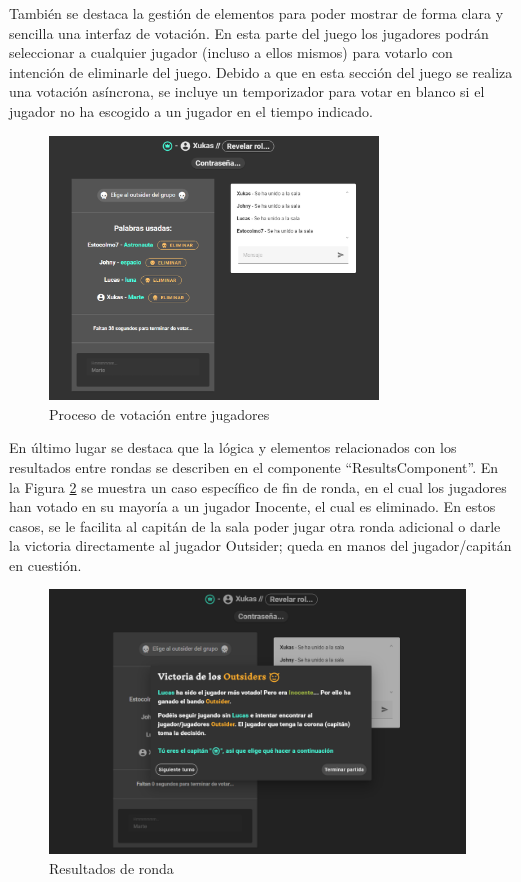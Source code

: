 También se destaca la gestión de elementos para poder mostrar de forma clara y sencilla una interfaz de votación. En esta parte
del juego los jugadores podrán seleccionar a cualquier jugador (incluso a ellos mismos) para votarlo con intención de eliminarle
del juego. Debido a que en esta sección del juego se realiza una votación asíncrona, se incluye un temporizador para votar 
en blanco si el jugador no ha escogido a un jugador en el tiempo indicado.

\begin{figure}[h]
	\centering
	\includegraphics[height=7cm,clip=true]{res_votacion.png}
	\caption{Proceso de votación entre jugadores}
	\label{fig:res_votacion}
\end{figure}

En último lugar se destaca que la lógica y elementos relacionados con los resultados entre rondas se describen en el 
componente ``ResultsComponent''. En la Figura \ref{fig:res_resultados} se muestra un caso específico de fin de ronda, en el cual los jugadores 
han votado en su mayoría a un jugador Inocente, el cual es eliminado. En estos casos, se le facilita al capitán de 
la sala poder jugar otra ronda adicional o darle la victoria directamente al jugador Outsider; queda en manos del 
jugador/capitán en cuestión.

\begin{figure}[h]
	\centering
	\includegraphics[height=7cm,clip=true]{res_resultados.png}
	\caption{Resultados de ronda}
	\label{fig:res_resultados}
\end{figure}


